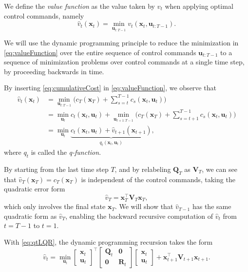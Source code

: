 \documentclass[10pt,a4paper]{article} %
\newcommand{\trsp}{{\scriptscriptstyle\top}}
\begin{document}
We define the \emph{value function} as the value taken by $v_t$ when applying optimal control commands, namely
\begin{equation}
	\hat{v}_t(\bm{x}_t) = \min_{\bm{u}_{t:T-1}} v_t(\bm{x}_t,\bm{u}_{t:T-1}).
	\label{eq:valueFunction}
\end{equation}

We will use the dynamic programming principle to reduce the minimization in \eqref{eq:valueFunction} over the entire sequence of control commands $\bm{u}_{t:T-1}$ to a sequence of minimization problems over control commands at a single time step, by proceeding backwards in time. 

By inserting \eqref{eq:cumulativeCost} in \eqref{eq:valueFunction}, we observe that
\begin{align}
	\hat{v}_t(\bm{x}_t) &= \min_{\bm{u}_{t:T-1}} \Big( c_T(\bm{x}_T) + \sum_{s=t}^{T-1} c_s(\bm{x}_t,\bm{u}_t) \Big) \nonumber\\
	&= \min_{\bm{u}_t} c_t(\bm{x}_t,\bm{u}_t) \! + 
	\!\!\! \min_{\bm{u}_{t+1:T-1}} \!\!\! \Big( \! c_T(\bm{x}_T) \! + \!\! \sum_{s=t+1}^{T-1} \!\! c_s(\bm{x}_t,\bm{u}_t) \! \Big) \nonumber\\
	&= \min_{\bm{u}_t} \underbrace{c_t(\bm{x}_t,\bm{u}_t) + \hat{v}_{t+1}(\bm{x}_{t+1})}_{q_t(\bm{x}_t,\bm{u}_t)},
	\label{eq:qtLQR}
\end{align}
where $q_t$ is called the \emph{q-function}.


By starting from the last time step $T$, and by relabeling $\bm{Q}_T$ as $\bm{V}_T$, we can see that $\hat{v}_T(\bm{x}_T) = c_T(\bm{x}_T)$ is independent of the control commands, taking the quadratic error form
\begin{equation}
	\hat{v}_{T} = \bm{x}_T^\trsp \bm{V}_T \bm{x}_T,
	\label{eq:vhatT}
\end{equation}
which only involves the final state $\bm{x}_T$. We will show that $\hat{v}_{T-1}$ has the same quadratic form as $\hat{v}_{T}$, enabling the backward recursive computation of $\hat{v}_{t}$ from $t=T-1$ to $t=1$.

With \eqref{eq:qtLQR}, the dynamic programming recursion takes the form 
\begin{equation}
	\hat{v}_t = \min_{\bm{u}_t} 
	\begin{bmatrix} \bm{x}_t \\ \bm{u}_t \end{bmatrix}^\trsp
	\begin{bmatrix} \bm{Q}_t & \bm{0} \\ \bm{0} & \bm{R}_t \end{bmatrix}
	\begin{bmatrix} \bm{x}_t \\ \bm{u}_t \end{bmatrix}
	+ 
	\bm{x}_{t+1}^\trsp \bm{V}_{t+1} \bm{x}_{t+1}.
	\label{eq:ct0}
\end{equation}
\end{document}
